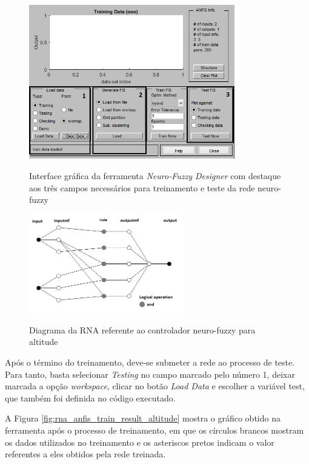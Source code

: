 \begin{figure}[!htb]
    \centering
    \caption{Interface gráfica da ferramenta \textit{Neuro-Fuzzy Designer} com destaque aos três campos necessários para treinamento e teste da rede neuro-fuzzy}
    \includegraphics[width=0.8\textwidth]{./04-figuras/anfisedit/anfisedit_screen}
    \label{fig:anfisedit_screen}
\end{figure}

\begin{figure}[!htb]
    \centering
    \caption{Diagrama da RNA referente ao controlador neuro-fuzzy para altitude}
    \includegraphics[width=0.6\textwidth]{./04-figuras/anfisedit/rna_anfis_altitude_gray}
    \label{fig:rna_anfis_altitude_gray}
\end{figure}

Após o término do treinamento, deve-se submeter a rede ao processo de teste. Para tanto, basta selecionar \textit{Testing} no campo marcado pelo número 1, deixar marcada a opção \textit{workspace}, clicar no botão \textit{Load Data} e escolher a variável {\ttfamily test}, que também foi definida no código executado.

A Figura \ref{fig:rna_anfis_train_result_altitude} mostra o gráfico obtido na ferramenta após o processo de treinamento, em que os círculos brancos mostram os dados utilizados no treinamento e os asteriscos pretos indicam o valor referentes a eles obtidos pela rede treinada.

